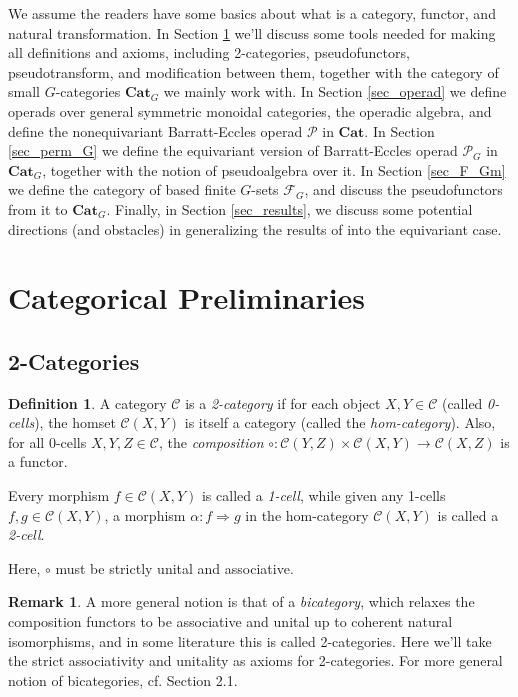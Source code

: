 \documentclass[openany, amssymb, psamsfonts]{amsart}
\theoremstyle{definition}
\newtheorem{defn}{Definition}[section]
\newtheorem{rem}{Remark}[section]
\numberwithin{equation}{section}
\newcommand{\Cat}{\mathbf{Cat}} %
\newcommand{\F}{\mathscr{F}} %
\newcommand{\cP}{\mathscr{P}} %
\newcommand{\C}{\mathscr{C}}
\begin{document}
\vspace{1pt}

We assume the readers have some basics about what is a category, functor, and natural transformation. In Section \ref{sec_CatPrelim} we'll discuss some tools needed for making all definitions and axioms, including 2-categories, pseudofunctors, pseudotransform, and modification between them, together with the category of small $G$-categories $\Cat_G$ we mainly work with. In Section \ref{sec_operad} we define operads over general symmetric monoidal categories, the operadic algebra, and define the nonequivariant Barratt-Eccles operad $\cP$ in $\Cat$. In Section \ref{sec_perm_G} we define the equivariant version of Barratt-Eccles operad $\cP_G$ in $\Cat_G$, together with the notion of pseudoalgebra over it. In Section \ref{sec_F_Gm} we define the category of based finite $G$-sets $\F_G$, and discuss the pseudofunctors from it to $\Cat_G$. Finally, in Section \ref{sec_results}, we discuss some potential directions (and obstacles) in generalizing the results of \cite{LMRZ26} into the equivariant case.

\vspace{1pt}

\section{Categorical Preliminaries}\label{sec_CatPrelim}
\subsection{2-Categories}\label{sub_2_cat}

\begin{defn}\label{defn_2_cat}
    A category $\C$ is a \emph{2-category} if for each object $X,Y\in\C$ (called \emph{0-cells}), the homset $\C(X,Y)$ is itself a category (called the \emph{hom-category}). Also, for all 0-cells $X,Y,Z\in\C$, the \emph{composition} $\circ:\C(Y,Z)\times\C(X,Y)\rightarrow\C(X,Z)$ is a functor.

    Every morphism $f\in \C(X,Y)$ is called a \emph{1-cell}, while given any 1-cells $f,g\in\C(X,Y)$, a morphism $\alpha:f\Rightarrow g$ in the hom-category $\C(X,Y)$ is called a \emph{2-cell}.
\end{defn}

Here, $\circ$ must be strictly unital and associative.

\begin{rem}\label{rem_bicat}
    A more general notion is that of a \emph{bicategory}, which relaxes the composition functors to be associative and unital up to coherent natural isomorphisms, and in some literature this is called 2-categories. Here we'll take the strict associativity and unitality as axioms for 2-categories. For more general notion of bicategories, cf. \cite{JY21} Section 2.1.
\end{rem}
\end{document}
